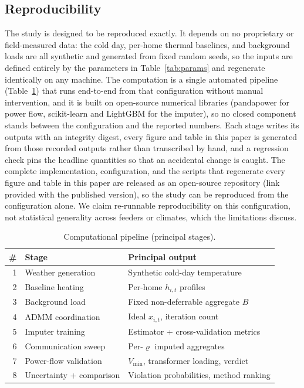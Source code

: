 \subsection{Reproducibility}
The study is designed to be reproduced exactly. It depends on no proprietary or
field-measured data: the cold day, per-home thermal baselines, and background
loads are all synthetic and generated from fixed random seeds, so the inputs are
defined entirely by the parameters in Table~\ref{tab:params} and regenerate
identically on any machine. The computation is a single automated pipeline
(Table~\ref{tab:stages}) that runs end-to-end from that configuration without
manual intervention, and it is built on open-source numerical libraries
(pandapower for power flow, scikit-learn and LightGBM for the imputer), so no
closed component stands between the configuration and the reported numbers. Each
stage writes its outputs with an integrity digest, every figure and table in this
paper is generated from those recorded outputs rather than transcribed by hand,
and a regression check pins the headline quantities so that an accidental change
is caught. The complete implementation, configuration, and the scripts that
regenerate every figure and table in this paper are released as an open-source
repository (link provided with the published version), so the study can be
reproduced from the configuration alone. We
claim re-runnable reproducibility on this configuration, not statistical
generality across feeders or climates, which the limitations discuss.

\begin{table}[t]
\centering
\caption{Computational pipeline (principal stages).}
\label{tab:stages}
\begin{tabular}{@{}r>{\raggedright\arraybackslash}p{}>{\raggedright\arraybackslash}p{}@{}}
\toprule
\# & Stage & Principal output \\
\midrule
1 & Weather generation      & Synthetic cold-day temperature \\
2 & Baseline heating        & Per-home $h_{i,t}$ profiles \\
3 & Background load         & Fixed non-deferrable aggregate $B$ \\
4 & ADMM coordination       & Ideal $x_{i,t}$, iteration count \\
5 & Imputer training        & Estimator + cross-validation metrics \\
6 & Communication sweep     & Per-$\varrho$ imputed aggregates \\
7 & Power-flow validation   & $V_{\min}$, transformer loading, verdict \\
8 & Uncertainty + comparison & Violation probabilities, method ranking \\
\bottomrule
\end{tabular}
\end{table}

